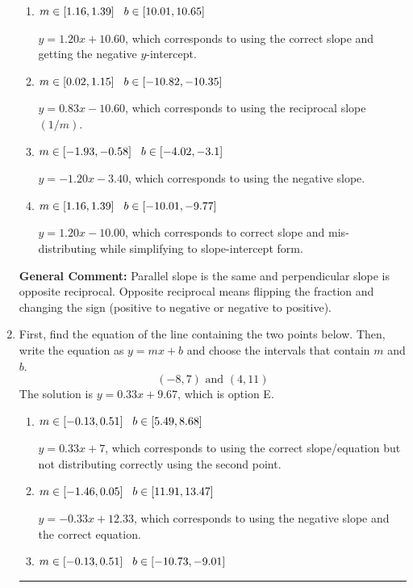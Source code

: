 \documentclass{extbook}[14pt]
\newcommand{\litem}[1]{\item #1

\rule{\textwidth}{0.4pt}}
\begin{document}
\begin{enumerate}
{\begin{enumerate}[label=\Alph*.]
* $y = 1.20x - 10.60$, which is the correct option.
\item \( m \in [1.16, 1.39] \hspace*{3mm} b \in [10.01, 10.65] \)

 $y = 1.20x + 10.60$, which corresponds to using the correct slope and getting the negative $y$-intercept.
\item \( m \in [0.02, 1.15] \hspace*{3mm} b \in [-10.82, -10.35] \)

 $y = 0.83x - 10.60$, which corresponds to using the reciprocal slope $(1/m)$.
\item \( m \in [-1.93, -0.58] \hspace*{3mm} b \in [-4.02, -3.1] \)

 $y = -1.20x - 3.40$, which corresponds to using the negative slope.
\item \( m \in [1.16, 1.39] \hspace*{3mm} b \in [-10.01, -9.77] \)

 $y = 1.20x - 10.00$, which corresponds to correct slope and mis-distributing while simplifying to slope-intercept form.
\end{enumerate}

\textbf{General Comment:} Parallel slope is the same and perpendicular slope is opposite reciprocal. Opposite reciprocal means flipping the fraction and changing the sign (positive to negative or negative to positive).
}
\litem{
First, find the equation of the line containing the two points below. Then, write the equation as $ y=mx+b $ and choose the intervals that contain $m$ and $b$.
\[ (-8, 7) \text{ and } (4, 11) \]
The solution is \( y = 0.33x + 9.67 \), which is option E.\begin{enumerate}[label=\Alph*.]
\item \( m \in [-0.13, 0.51] \hspace*{3mm} b \in [5.49, 8.68] \)

 $y = 0.33x + 7$, which corresponds to using the correct slope/equation but not distributing correctly using the second point.
\item \( m \in [-1.46, 0.05] \hspace*{3mm} b \in [11.91, 13.47] \)

 $y = -0.33x + 12.33$, which corresponds to using the negative slope and the correct equation.
\item \( m \in [-0.13, 0.51] \hspace*{3mm} b \in [-10.73, -9.01] \)


\end{enumerate}}
\end{enumerate}
\end{document}
